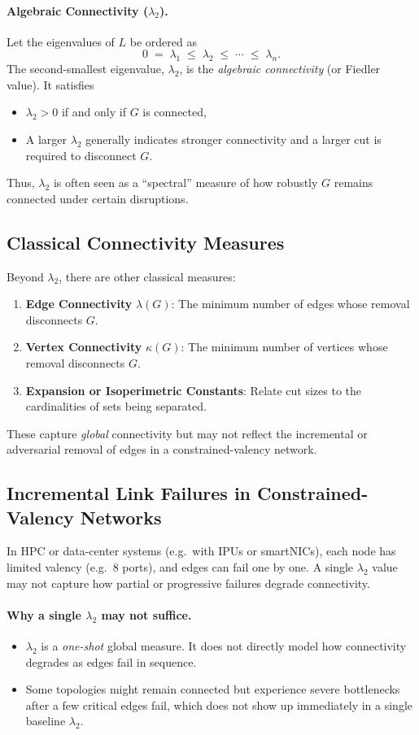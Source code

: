 \paragraph{Algebraic Connectivity ($\lambda_2$).}
Let the eigenvalues of $L$ be ordered as
\[
  0 \;=\; \lambda_1 \;\le\; \lambda_2 \;\le\; \cdots \;\le\; \lambda_n.
\]
The second-smallest eigenvalue, $\lambda_2$, is the \emph{algebraic connectivity} (or Fiedler value). It satisfies
\begin{itemize}
\item $\lambda_2>0$ if and only if $G$ is connected,
\item A larger $\lambda_2$ generally indicates stronger connectivity and a larger cut is required to disconnect $G$.
\end{itemize}
Thus, $\lambda_2$ is often seen as a ``spectral'' measure of how robustly $G$ remains connected under certain disruptions.

\subsection{Classical Connectivity Measures}

Beyond $\lambda_2$, there are other classical measures:
\begin{enumerate}
\item \textbf{Edge Connectivity} $\lambda(G)$: The minimum number of edges whose removal disconnects $G$.
\item \textbf{Vertex Connectivity} $\kappa(G)$: The minimum number of vertices whose removal disconnects $G$.
\item \textbf{Expansion or Isoperimetric Constants}: Relate cut sizes to the cardinalities of sets being separated.
\end{enumerate}
These capture \emph{global} connectivity but may not reflect the incremental or adversarial removal of edges in a constrained-valency network.

\subsection{Incremental Link Failures in Constrained-Valency Networks}

In HPC or data-center systems (e.g.\ with IPUs or smartNICs), each node has limited valency (e.g.\ 8 ports), and edges can fail one by one. A single $\lambda_2$ value may not capture how partial or progressive failures degrade connectivity.

\paragraph{Why a single $\lambda_2$ may not suffice.}
\begin{itemize}
\item $\lambda_2$ is a \emph{one-shot} global measure. It does not directly model how connectivity degrades as edges fail in sequence.
\item Some topologies might remain connected but experience severe bottlenecks after a few critical edges fail, which does not show up immediately in a single baseline $\lambda_2$.
\end{itemize}

